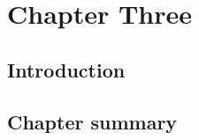 %
%
\chapter{Chapter Three} \label{chap:three}

\section{Introduction} \label{sec:intro}


\section{Chapter summary}

